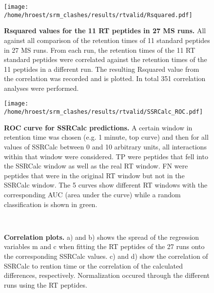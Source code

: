 \begin{figure}
\texttt{[image: /home/hroest/srm\_clashes/results/rtvalid/Rsquared.pdf]}
\caption{ \textbf{Rsquared values for the 11 RT peptides in 27 MS runs.}
All against all comparison of the retention times of 11 standard peptides in 27
MS runs. From each run, the retention times of the 11 RT standard peptides were
correlated against the retention times of the 11 peptides in a different run.
The resulting Rsquared value from the correlation was recorded and is plotted.
In total 351 correlation analyses were performed.  }
\label{fig:Rsquared}
\end{figure}

\begin{figure}
\texttt{[image: /home/hroest/srm\_clashes/results/rtvalid/SSRCalc\_ROC.pdf]}
\caption{ \textbf{ROC curve for SSRCalc predictions.}
A certain window in retention time was chosen (e.g. 1 minute, top curve) and
then for all values of SSRCalc between 0 and 10 arbitrary units, all
interactions within that window were considered.
TP were peptides that fell into the SSRCalc window as well as the real RT
window. FN were peptides that were in the original RT window but not in the
SSRCalc window.  The 5 curves show different RT windows with the corresponding
AUC (area under the curve) while a random classification is shown in green.}
\label{fig:SSRCalcROC}
\end{figure}


\begin{figure}

\center
{} 
  \\


\caption{ \textbf{Correlation plots.}
a) and b) shows the spread of the regression variables m and c when fitting the
RT peptides of the 27 runs onto the corresponding SSRCalc values. c) and d)
show the correlation of SSRCalc to rention time or the
correlation of the calculated differences, respectively. Normalization occured
through the different runs using the RT peptides. }
\label{fig:400ra.comp}
\end{figure}



